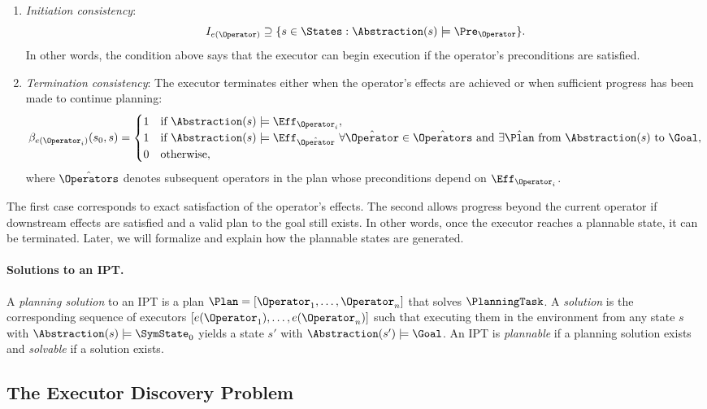 \begin{enumerate}[leftmargin=*]
    \item \emph{Initiation consistency}:
    \[
    I_{e(\Operator)} \supseteq \{ s \in \States : \Abstraction(s) \models \Pre_{\Operator} \}.
    \]
    In other words, the condition above says that the executor can begin execution if the operator's preconditions are satisfied.

    \item \emph{Termination consistency}: The executor terminates either when the operator's effects are achieved or when sufficient progress has been made to continue planning:
    \[
    \beta_{e(\Operator_i)}(s_0, s) = 
    \begin{cases}
        1 & \text{if } \Abstraction(s) \models \Eff_{\Operator_i}, \\
        1 & \text{if } \Abstraction(s) \models \Eff_{\hat{\Operator}} \ \forall \hat{\Operator} \in \hat{\Operators} \ \text{and } \exists \hat{\Plan} \text{ from } \Abstraction(s) \text{ to } \Goal, \\
        0 & \text{otherwise},
    \end{cases}
    \]
    where $\hat{\Operators}$ denotes subsequent operators in the plan whose preconditions depend on $\Eff_{\Operator_i}$.
\end{enumerate}

The first case corresponds to exact satisfaction of the operator’s effects. The second allows progress beyond the current operator if downstream effects are satisfied and a valid plan to the goal still exists. In other words, once the executor reaches a plannable state, it can be terminated. Later, we will formalize and explain how the plannable states are generated.

\paragraph{Solutions to an IPT.}
A \emph{planning solution} to an IPT is a plan $\Plan = [\Operator_1, \ldots, \Operator_n]$ that solves $\PlanningTask$. A \emph{solution} is the corresponding sequence of executors $[e(\Operator_1), \ldots, e(\Operator_n)]$ such that executing them in the environment from any state $s$ with $\Abstraction(s) \models \SymState_0$ yields a state $s'$ with $\Abstraction(s') \models \Goal$. An IPT is \emph{plannable} if a planning solution exists and \emph{solvable} if a solution exists.

\subsection{The Executor Discovery Problem}
\label{sec:executor_discovery}

